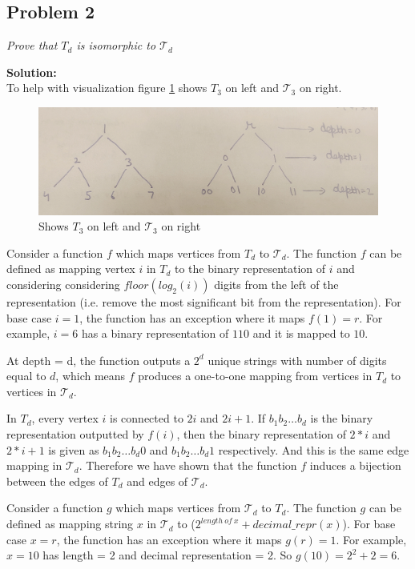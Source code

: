 \documentclass[12pt,a4paper]{article}
\newcommand{\solution}{\noindent\textbf{Solution:}\\\indent}
\begin{document}
\newpage
\subsection*{Problem 2}
\textit{
    Prove that $T_d$ is isomorphic to $\mathcal{T}_d$
}

\solution
To help with visualization figure \ref{fig:2_1} shows $T_3$ on left and $\mathcal{T}_3$ on right.

\begin{figure}[H]
    \centering
    \includegraphics[width=\textwidth]{prob_2.jpg}
    \caption{Shows $T_3$ on left and $\mathcal{T}_3$ on right}
    \label{fig:2_1}
\end{figure}

Consider a function $f$ which maps vertices from $T_d$ to $\mathcal{T}_d$. The function $f$ can be defined as mapping vertex $i$ in $T_d$ to the binary representation of $i$ and considering considering $floor(log_2(i))$ digits from the left of the representation (i.e. remove the most significant bit from the representation). For base case $i=1$, the function has an exception where it maps $f(1) = r$. For example, $i=6$ has a binary representation of $110$ and it is mapped to $10$.

At depth = d, the function outputs a $2^d$ unique strings with number of digits equal to $d$, which means $f$ produces a one-to-one mapping from vertices in $T_d$ to vertices in $\mathcal{T}_d$.

In $T_d$, every vertex $i$ is connected to $2i$ and $2i+1$. If $b_1b_2\hdots b_d$ is the binary representation outputted by $f(i)$, then the binary representation of $2*i$ and $2*i+1$ is given as $b_1b_2\hdots b_d0$ and $b_1b_2\hdots b_d1$ respectively. And this is the same edge mapping in $\mathcal{T}_d$. Therefore we have shown that the function $f$ induces a bijection between the edges of $T_d$ and edges of $\mathcal{T}_d$.

Consider a function $g$ which maps vertices from $\mathcal{T}_d$ to $T_d$. The function $g$ can be defined as mapping string $x$ in $\mathcal{T}_d$ to ($2^{length\ of\ x} + decimal\_repr(x)$). For base case $x=r$, the function has an exception where it maps $g(r) = 1$. For example, $x=10$ has length = 2 and decimal representation = 2. So $g(10) = 2^2 + 2 = 6$.
\end{document}

